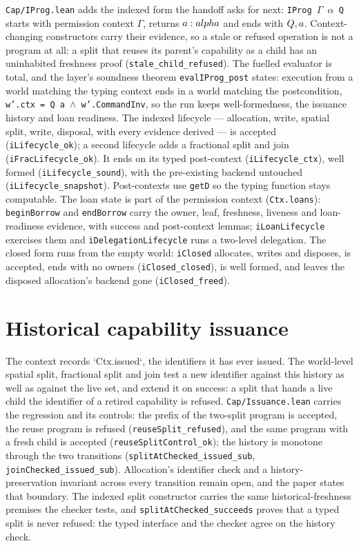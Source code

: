 \documentclass[10pt,a4paper]{article}
\newcommand{\file}[1]{\texttt{\small #1}}
\begin{document}
\file{Cap/IProg.lean} adds the indexed form the handoff asks for next:
\texttt{IProg \(\Gamma\) \(\alpha\) Q} starts with permission context \(\Gamma\),
returns \(a : \\alpha\) and ends with \(Q\\,a\). Context-changing constructors carry their
evidence, so a stale or refused operation is not a program at all: a split that
reuses its parent's capability as a child has an uninhabited freshness proof
(\texttt{stale\_child\_refused}). The fuelled evaluator is total, and the
layer's soundness theorem \texttt{evalIProg\_post} states: execution from a world
matching the typing context ends in a world matching the postcondition,
\texttt{w'.ctx = Q a \(\land\) w'.CommandInv}, so the run keeps well-formedness,
the issuance history and loan readiness. The indexed lifecycle --- allocation, write,
spatial split, write, disposal, with every evidence derived --- is accepted
(\texttt{iLifecycle\_ok}); a second lifecycle adds a fractional split and join
(\texttt{iFracLifecycle\_ok}). It ends on its typed post-context
(\texttt{iLifecycle\_ctx}), well formed (\texttt{iLifecycle\_sound}), with the
pre-existing backend untouched (\texttt{iLifecycle\_snapshot}). Post-contexts
use \texttt{getD} so the typing function stays computable. The loan state is
part of the permission context (\texttt{Ctx.loans}): \texttt{beginBorrow} and
\texttt{endBorrow} carry the owner, leaf, freshness, liveness and loan-readiness
evidence, with success and post-context lemmas; \texttt{iLoanLifecycle} exercises
them and \texttt{iDelegationLifecycle} runs a two-level delegation. The closed
form runs from the empty world: \texttt{iClosed} allocates, writes and disposes,
is accepted, ends with no owners (\texttt{iClosed\_closed}), is well formed, and
leaves the disposed allocation's backend gone (\texttt{iClosed\_freed}).

\section{Historical capability issuance}

The context records `Ctx.issued`, the identifiers it has ever issued. The
world-level spatial split, fractional split and join test a new identifier
against this history as well as against the live set, and extend it on success:
a split that hands a live child the identifier of a retired capability is
refused. \file{Cap/Issuance.lean} carries the regression and its controls: the
prefix of the two-split program is accepted, the reuse program is refused
(\texttt{reuseSplit\_refused}), and the same program with a fresh child is
accepted (\texttt{reuseSplitControl\_ok}); the history is monotone through the
two transitions (\texttt{splitAtChecked\_issued\_sub},
\texttt{joinChecked\_issued\_sub}). Allocation's identifier check and a
history-preservation invariant across every transition remain open, and the
paper states that boundary. The indexed split constructor carries the same
historical-freshness premises the checker tests, and
\texttt{splitAtChecked\_succeeds} proves that a typed split is never refused:
the typed interface and the checker agree on the history check.
\end{document}
